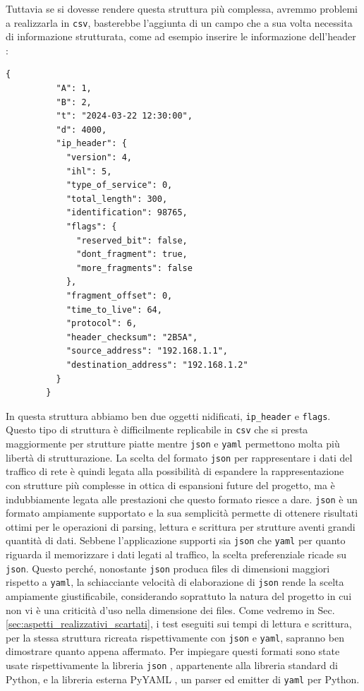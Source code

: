 \documentclass[binding=0.6cm]{sapthesis}
\begin{document}
Tuttavia se si dovesse rendere questa struttura più complessa, avremmo problemi a realizzarla in \texttt{csv}, basterebbe l'aggiunta
di un campo che a sua volta necessita di informazione strutturata, come ad esempio 
inserire le informazione dell'header \cite{RFC791}:
{\scriptsize %
\begin{lstlisting}[caption={Pacchetto di rete maggiormente strutturato in \texttt{json}}]
        {
          "A": 1,
          "B": 2,
          "t": "2024-03-22 12:30:00",
          "d": 4000,
          "ip_header": {
            "version": 4,
            "ihl": 5,
            "type_of_service": 0,
            "total_length": 300,
            "identification": 98765,
            "flags": {
              "reserved_bit": false,
              "dont_fragment": true,
              "more_fragments": false
            },
            "fragment_offset": 0,
            "time_to_live": 64,
            "protocol": 6,
            "header_checksum": "2B5A",
            "source_address": "192.168.1.1",
            "destination_address": "192.168.1.2"
          }
        }
\end{lstlisting}
}
In questa struttura abbiamo ben due oggetti nidificati, \texttt{ip\_header} e \texttt{flags}. 
Questo tipo di struttura è difficilmente replicabile in \texttt{csv} che si presta maggiormente
per strutture piatte mentre \texttt{json} e \texttt{yaml} permettono molta più libertà di strutturazione.
La scelta del formato \texttt{json} per rappresentare i dati del traffico di rete è quindi legata alla possibilità di espandere la
rappresentazione con strutture più complesse in ottica di espansioni future del progetto, ma è indubbiamente legata alle prestazioni che questo formato riesce a dare.
\texttt{json} è un formato ampiamente supportato e la sua semplicità permette di ottenere risultati ottimi per le operazioni di parsing, lettura e scrittura per strutture aventi grandi quantità di dati.
Sebbene l'applicazione supporti sia \texttt{json} che \texttt{yaml} per quanto riguarda il memorizzare i dati legati al traffico, la scelta preferenziale ricade su \texttt{json}.
Questo perché, nonostante \texttt{json} produca files di dimensioni maggiori rispetto a \texttt{yaml}, la schiacciante velocità di elaborazione di \texttt{json} rende la scelta ampiamente giustificabile, considerando soprattuto la natura del progetto in cui non vi è una
criticità d'uso nella dimensione dei files. Come vedremo in Sec. \ref{sec:aspetti_realizzativi_scartati}, 
i test eseguiti sui tempi di lettura e scrittura, per la stessa struttura
ricreata rispettivamente con \texttt{json} e \texttt{yaml}, sapranno ben
dimostrare quanto appena affermato. 
Per impiegare questi formati sono state usate rispettivamente la libreria \texttt{json} \cite{PythonJSONLibrary}, appartenente alla libreria standard di Python, e la
libreria esterna PyYAML \cite{PyYAMLDocumentation}, un parser ed emitter di \texttt{yaml} per Python.
\end{document}
